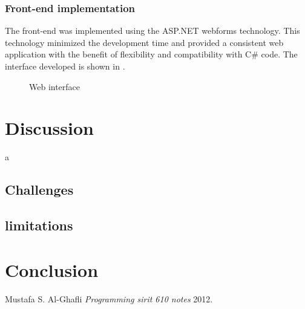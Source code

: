 \documentclass[a4paper,twoside]{article}
\begin{document}
\subsubsection{Front-end implementation}
The front-end was implemented using the ASP.NET webforms technology. This technology minimized the development time and provided a consistent web application with the benefit of flexibility and compatibility with C\# code. The interface developed is shown in .
\begin{figure}
\centering
{}
\caption{Web interface}
\label{web}
\end{figure}
\section{Discussion}
a
\subsection{Challenges}
\subsection{limitations}


\section{Conclusion}




 






\begin{journals}
 Mustafa S. Al-Ghafli {\em Programming sirit 610 notes} 2012.
\end{journals}
\end{document}

